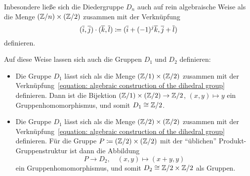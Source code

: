 Inbesondere ließe sich die Diedergruppe $D_n$ auch auf rein algebraische Weise als die Menge $(\mathbb{Z}/n) \times (\mathbb{Z}/2)$ zusammen mit der Verknüpfung
\begin{equation}
  \label{equation: algebraic construction of the dihedral group}
            (\overline{i}, \overline{j}) \cdot (\overline{k}, \overline{l})
  \coloneqq (\overline{i} + (-1)^j \overline{k}, \overline{j} + \overline{l})
\end{equation}
definieren.

\begin{remark}
  Auf diese Weise lassen sich auch die Gruppen $D_1$ und $D_2$ definieren:
  \begin{itemize}
    \item
      Die Gruppe $D_1$ lässt sich als die Menge $(\mathbb{Z}/1) \times (\mathbb{Z}/2)$ zusammen mit der Verknüpfung~\eqref{equation: algebraic construction of the dihedral group} definieren.
      Dann ist die Bijektion $(\mathbb{Z}/1) \times (\mathbb{Z}/2) \to \mathbb{Z}/2$, $(x,y) \mapsto y$ ein Gruppenhomomorphismus, und somit $D_1 \cong \mathbb{Z}/2$.
    \item
      Die Gruppe $D_1$ lässt sich als die Menge $(\mathbb{Z}/2) \times (\mathbb{Z}/2)$ zusammen mit der Verknüpfung~\eqref{equation: algebraic construction of the dihedral group} definieren.
      Für die Gruppe $P \coloneqq (\mathbb{Z}/2) \times (\mathbb{Z}/2)$ mit der \enquote{üblichen} Pro\-dukt-Gruppen\-struk\-tur ist dann die Abbildung
      \[
                P
        \to     D_2,
        \quad   (x, y)
        \mapsto (x+y,y)
      \]
      ein Gruppenhomomorphismus, und somit $D_2 \cong \mathbb{Z}/2 \times \mathbb{Z}/2$ als Gruppen.
  \end{itemize}
  

\end{remark}
